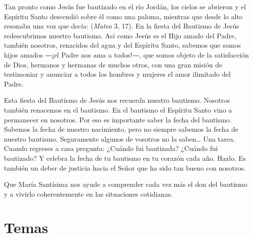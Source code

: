 \begin{body}
				Tan pronto como Jesús fue bautizado en el río Jordán, los cielos se abrieron y el Espíritu Santo descendió sobre él como una paloma, mientras que desde lo alto resonaba una voz que decía:  (\emph{Mateo} 3, 17). En la fiesta del Bautismo de Jesús redescubrimos nuestro bautismo. Así como Jesús es el Hijo amado del Padre, también nosotros, renacidos del agua y del Espíritu Santo, sabemos que somos hijos amados ―¡el Padre nos ama a todos!―, que somos objeto de la satisfacción de Dios, hermanos y hermanas de muchos otros, con una gran misión de testimoniar y anunciar a todos los hombres y mujeres el amor ilimitado del Padre.
				
				Esta fiesta del Bautismo de Jesús nos recuerda nuestro bautismo. Nosotros también renacemos en el bautismo. En el bautismo el Espíritu Santo vino a permanecer en nosotros. Por eso es importante saber la fecha del bautismo. Sabemos la fecha de nuestro nacimiento, pero no siempre sabemos la fecha de nuestro bautismo. Seguramente algunos de vosotros no la saben\ldots{} Una tarea. Cuando regreses a casa pregunta: ¿Cuándo fui bautizada? ¿Cuándo fui bautizado? Y celebra la fecha de tu bautismo en tu corazón cada año. Hazlo. Es también un deber de justicia hacia el Señor que ha sido tan bueno con nosotros.
				
				Que María Santísima nos ayude a comprender cada vez más el don del bautismo y a vivirlo coherentemente en las situaciones cotidianas.				
			\end{body}

\newsection

	\section{Temas}

